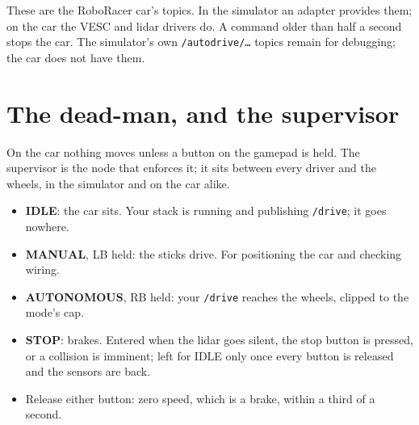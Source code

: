 \documentclass[11pt,a4paper]{article}
\begin{document}
\smallskip
These are the RoboRacer car's topics. In the simulator an adapter provides them; on the car the
VESC and lidar drivers do. A command older than half a second stops the car. The simulator's own
\texttt{/autodrive/\ldots} topics remain for debugging; the car does not have them.

\section{The dead-man, and the supervisor}
\label{sec:deadman}

On the car nothing moves unless a button on the gamepad is held. The supervisor is the node that
enforces it; it sits between every driver and the wheels, in the simulator and on the car alike.

\begin{center}
\end{center}

\begin{itemize}
  \item \textbf{IDLE}: the car sits. Your stack is running and publishing \texttt{/drive}; it goes nowhere.
  \item \textbf{MANUAL}, LB held: the sticks drive. For positioning the car and checking wiring.
  \item \textbf{AUTONOMOUS}, RB held: your \texttt{/drive} reaches the wheels, clipped to the mode's cap.
  \item \textbf{STOP}: brakes. Entered when the lidar goes silent, the stop button is pressed, or a
  collision is imminent; left for IDLE only once every button is released and the sensors are back.
  \item Release either button: zero speed, which is a brake, within a third of a second.
\end{itemize}
\end{document}
